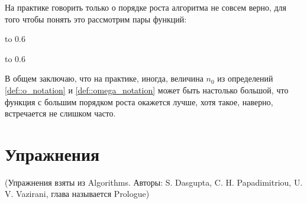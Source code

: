 На практике говорить только о порядке роста алгоритма не совсем верно, для того чтобы понять это рассмотрим пары функций:
\par\bigskip

\hbox to 0.6
\par\bigskip

\hbox to 0.6

В общем заключаю, что на практике, иногда, величина $ n_0 $ из определений \ref{def::o_notation} и \ref{def::omega_notation} может быть настолько большой, что функция с большим порядком роста окажется лучше, хотя такое, наверно, встречается не слишком часто.

\section{Упражнения}

(Упражнения взяты из Algorithms. Авторы: S. Dasgupta, C. H. Papadimitriou, U. V. Vazirani, глава называется Prologue)

